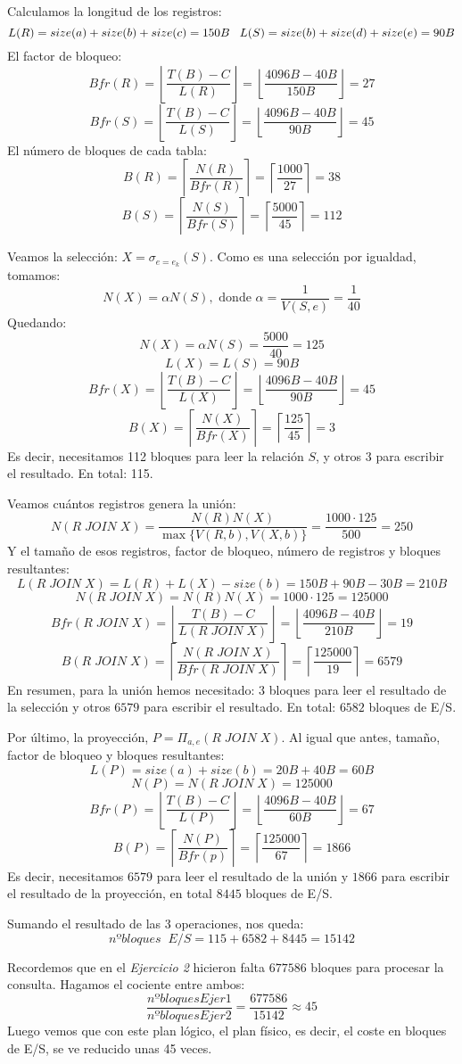 \documentclass[12pt]{report}
\begin{document}
Calculamos la longitud de los registros:
\[
L(R)=size(a)+size(b)+size(c)=150B \;\;\; L(S)=size(b)+size(d)+size(e)=90B
\]
El factor de bloqueo:
\[
Bfr(R)=\left\lfloor\frac{T(B)-C}{L(R)}\right\rfloor=\left\lfloor\frac{4096B-40B}{150B}\right\rfloor=27
\]
\[
Bfr(S)=\left\lfloor\frac{T(B)-C}{L(S)}\right\rfloor=\left\lfloor\frac{4096B-40B}{90B}\right\rfloor=45
\]
El número de bloques de cada tabla:
\[
B(R)=\left\lceil\frac{N(R)}{Bfr(R)}\right\rceil=\left\lceil\frac{1000}{27}\right\rceil=38
\]
\[
B(S)=\left\lceil\frac{N(S)}{Bfr(S)}\right\rceil=\left\lceil\frac{5000}{45}\right\rceil=112
\]

Veamos la selección: $X=\sigma_{e=e_k}(S)$. Como es una selección por igualdad, tomamos:
\[
N(X)=\alpha N(S), \text{ donde } \alpha=\frac{1}{V(S,e)}=\frac{1}{40}
\]
Quedando:
\[
N(X)=\alpha N(S)=\frac{5000}{40}=125
\]
\[
L(X)=L(S)=90B
\]
\[
Bfr(X)=\left\lfloor\frac{T(B)-C}{L(X)}\right\rfloor=\left\lfloor\frac{4096B-40B}{90B}\right\rfloor=45
\]
\[
B(X)=\left\lceil\frac{N(X)}{Bfr(X)}\right\rceil=\left\lceil\frac{125}{45}\right\rceil=3
\]
Es decir, necesitamos 112 bloques para leer la relación $S$, y otros 3 para escribir el resultado. En total: 115.

Veamos cuántos registros genera la unión:
\[
N(R\;JOIN\;X)=\frac{N(R)N(X)}{\max\{V(R,b),V(X,b)\}}= \frac{1000\cdot 125}{500}=250
\]
Y el tamaño de esos registros, factor de bloqueo, número de registros y bloques resultantes:
\[
L(R\;JOIN\;X)=L(R)+L(X)-size(b)=150B+90B-30B=210B
\]
\[
N(R\;JOIN\;X)=N(R)N(X)=1000\cdot 125 = 125000
\]
\[
Bfr(R\;JOIN\;X)=\left\lfloor\frac{T(B)-C}{L(R\;JOIN\;X)}\right\rfloor=\left\lfloor\frac{4096B-40B}{210B}\right\rfloor=19
\]
\[
B(R\;JOIN\;X)=\left\lceil\frac{N(R\;JOIN\;X)}{Bfr(R\;JOIN\;X)}\right\rceil=\left\lceil\frac{125000}{19}\right\rceil=6579
\]
En resumen, para la unión hemos necesitado: $3$ bloques para leer el resultado de la selección y otros $6579$ para escribir el resultado. En total: $6582$ bloques de E/S.

Por último, la proyección, $P=\Pi_{a,e}(R\;JOIN\;X)$. Al igual que antes, tamaño, factor de bloqueo y bloques resultantes:
\[
L(P)=size(a)+size(b)=20B+40B=60B
\]
\[
N(P)=N(R\;JOIN\;X)=125000
\]
\[
Bfr(P)=\left\lfloor\frac{T(B)-C}{L(P)}\right\rfloor=\left\lfloor\frac{4096B-40B}{60B}\right\rfloor=67
\]
\[
B(P)=\left\lceil\frac{N(P)}{Bfr(p)}\right\rceil=\left\lceil\frac{125000}{67}\right\rceil=1866
\]
Es decir, necesitamos $6579$ para leer el resultado de la unión y $1866$ para escribir el resultado de la proyección, en total $8445$ bloques de E/S.

Sumando el resultado de las 3 operaciones, nos queda:
\[
nºbloques \;\; E/S = 115 + 6582 + 8445 = 15142
\]

Recordemos que en el \textit{Ejercicio 2} hicieron falta $677586$ bloques para procesar la consulta. Hagamos el cociente entre ambos:
\[
\frac{nºbloquesEjer1}{nºbloquesEjer2}=\frac{677586}{15142}\approx 45
\]
Luego vemos que con este plan lógico, el plan físico, es decir, el coste en bloques de E/S, se ve reducido unas 45 veces.
\end{document}
